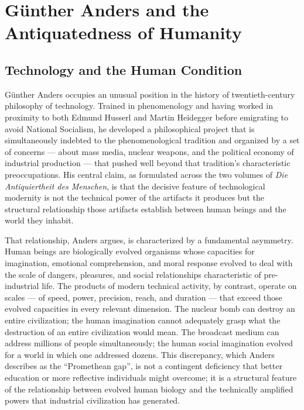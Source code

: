 \documentclass[12pt]{memoir}
\begin{document}
\section{Günther Anders and the Antiquatedness of Humanity}
\label{sec:anders}

\subsection{Technology and the Human Condition}

Günther Anders occupies an unusual position in the history of twentieth-century philosophy of
technology. Trained in phenomenology and having worked in proximity to both Edmund Husserl and
Martin Heidegger before emigrating to avoid National Socialism, he developed a philosophical
project that is simultaneously indebted to the phenomenological tradition and organized by a
set of concerns — about mass media, nuclear weapons, and the political economy of industrial
production — that pushed well beyond that tradition's characteristic preoccupations. His central
claim, as formulated across the two volumes of \textit{Die Antiquiertheit des Menschen}, is
that the decisive feature of technological modernity is not the technical power of the artifacts
it produces but the structural relationship those artifacts establish between human beings and
the world they inhabit.\citep[3--15]{anders1956}

That relationship, Anders argues, is characterized by a fundamental asymmetry. Human beings
are biologically evolved organisms whose capacities for imagination, emotional comprehension,
and moral response evolved to deal with the scale of dangers, pleasures, and social
relationships characteristic of pre-industrial life. The products of modern technical activity,
by contrast, operate on scales — of speed, power, precision, reach, and duration — that exceed
those evolved capacities in every relevant dimension. The nuclear bomb can destroy an entire
civilization; the human imagination cannot adequately grasp what the destruction of an entire
civilization would mean. The broadcast medium can address millions of people simultaneously;
the human social imagination evolved for a world in which one addressed dozens. This
discrepancy, which Anders describes as the \enquote{Promethean gap}, is not a contingent
deficiency that better education or more reflective individuals might overcome; it is a
structural feature of the relationship between evolved human biology and the technically
amplified powers that industrial civilization has generated.
\end{document}
